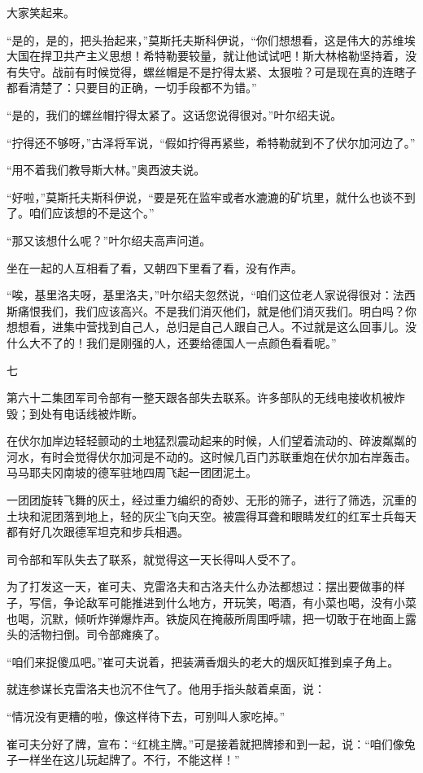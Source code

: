 大家笑起来。

“是的，是的，把头抬起来，”莫斯托夫斯科伊说，“你们想想看，这是伟大的苏维埃大国在捍卫共产主义思想！希特勒要较量，就让他试试吧！斯大林格勒坚持着，没有失守。战前有时候觉得，螺丝帽是不是拧得太紧、太狠啦？可是现在真的连瞎子都看清楚了：只要目的正确，一切手段都不为错。”

“是的，我们的螺丝帽拧得太紧了。这话您说得很对。”叶尔绍夫说。

“拧得还不够呀，”古泽将军说，“假如拧得再紧些，希特勒就到不了伏尔加河边了。”

“用不着我们教导斯大林。”奥西波夫说。

“好啦，”莫斯托夫斯科伊说，“要是死在监牢或者水漉漉的矿坑里，就什么也谈不到了。咱们应该想的不是这个。”

“那又该想什么呢？”叶尔绍夫高声问道。

坐在一起的人互相看了看，又朝四下里看了看，没有作声。

“唉，基里洛夫呀，基里洛夫，”叶尔绍夫忽然说，“咱们这位老人家说得很对：法西斯痛恨我们，我们应该高兴。不是我们消灭他们，就是他们消灭我们。明白吗？你想想看，进集中营找到自己人，总归是自己人跟自己人。不过就是这么回事儿。没什么大不了的！我们是刚强的人，还要给德国人一点颜色看看呢。”

七

第六十二集团军司令部有一整天跟各部失去联系。许多部队的无线电接收机被炸毁；到处有电话线被炸断。

在伏尔加岸边轻轻颤动的土地猛烈震动起来的时候，人们望着流动的、碎波粼粼的河水，有时会觉得伏尔加河是不动的。这时候几百门苏联重炮在伏尔加右岸轰击。马马耶夫冈南坡的德军驻地四周飞起一团团泥土。

一团团旋转飞舞的灰土，经过重力编织的奇妙、无形的筛子，进行了筛选，沉重的土块和泥团落到地上，轻的灰尘飞向天空。被震得耳聋和眼睛发红的红军士兵每天都有好几次跟德军坦克和步兵相遇。

司令部和军队失去了联系，就觉得这一天长得叫人受不了。

为了打发这一天，崔可夫、克雷洛夫和古洛夫什么办法都想过：摆出要做事的样子，写信，争论敌军可能推进到什么地方，开玩笑，喝酒，有小菜也喝，没有小菜也喝，沉默，倾听炸弹爆炸声。铁旋风在掩蔽所周围呼啸，把一切敢于在地面上露头的活物扫倒。司令部瘫痪了。

“咱们来捉傻瓜吧。”崔可夫说着，把装满香烟头的老大的烟灰缸推到桌子角上。

就连参谋长克雷洛夫也沉不住气了。他用手指头敲着桌面，说：

“情况没有更糟的啦，像这样待下去，可别叫人家吃掉。”

崔可夫分好了牌，宣布：“红桃主牌。”可是接着就把牌掺和到一起，说：“咱们像兔子一样坐在这儿玩起牌了。不行，不能这样！”

